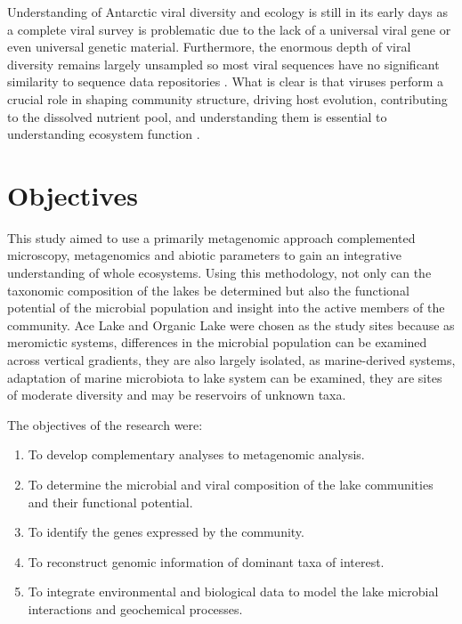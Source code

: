 Understanding of Antarctic viral diversity and ecology is still in its early days as a complete viral survey is problematic due to the lack of a universal viral gene or even universal genetic material. 
Furthermore, the enormous depth of viral diversity remains largely unsampled so most viral sequences have no significant similarity to sequence data repositories \cite{Lopez-Bueno2009}. 
What is clear is that viruses perform a crucial role in shaping community structure, driving host evolution, contributing to the dissolved nutrient pool, and understanding them is essential to understanding ecosystem function \cite{Danovaro2011}. 

\section{Objectives}
This study aimed to use a primarily metagenomic approach complemented microscopy, metagenomics and abiotic parameters to gain an integrative understanding of whole ecosystems.
Using this methodology, not only can the taxonomic composition of the lakes be determined but also the functional potential of the microbial population and insight into the active members of the community.
Ace Lake and Organic Lake were chosen as the study sites because as meromictic systems, differences in the microbial population can be examined across vertical gradients, they are also largely isolated, as marine-derived systems, adaptation of marine microbiota to lake system can be examined, they are sites of moderate diversity and may be reservoirs of unknown taxa.

The objectives of the research were:

\begin{enumerate}
\item 
  To develop complementary analyses to metagenomic analysis.

\item
  To determine the microbial and viral composition of the lake communities and their functional potential.

\item
  To identify the genes expressed by the community.

\item
  To reconstruct genomic information of dominant taxa of interest.

\item
  To integrate environmental and biological data to model the lake microbial interactions and geochemical processes.

\end{enumerate}

